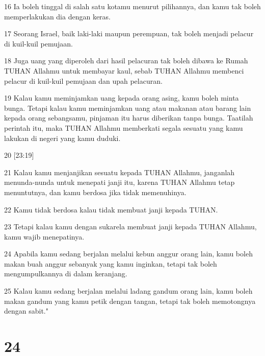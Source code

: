 \par 16 Ia boleh tinggal di salah satu kotamu menurut pilihannya, dan kamu tak boleh memperlakukan dia dengan keras.
\par 17 Seorang Israel, baik laki-laki maupun perempuan, tak boleh menjadi pelacur di kuil-kuil pemujaan.
\par 18 Juga uang yang diperoleh dari hasil pelacuran tak boleh dibawa ke Rumah TUHAN Allahmu untuk membayar kaul, sebab TUHAN Allahmu membenci pelacur di kuil-kuil pemujaan dan upah pelacuran.
\par 19 Kalau kamu meminjamkan uang kepada orang asing, kamu boleh minta bunga. Tetapi kalau kamu meminjamkan uang atau makanan atau barang lain kepada orang sebangsamu, pinjaman itu harus diberikan tanpa bunga. Taatilah perintah itu, maka TUHAN Allahmu memberkati segala sesuatu yang kamu lakukan di negeri yang kamu duduki.
\par 20 [23:19]
\par 21 Kalau kamu menjanjikan sesuatu kepada TUHAN Allahmu, janganlah menunda-nunda untuk menepati janji itu, karena TUHAN Allahmu tetap menuntutnya, dan kamu berdosa jika tidak memenuhinya.
\par 22 Kamu tidak berdosa kalau tidak membuat janji kepada TUHAN.
\par 23 Tetapi kalau kamu dengan sukarela membuat janji kepada TUHAN Allahmu, kamu wajib menepatinya.
\par 24 Apabila kamu sedang berjalan melalui kebun anggur orang lain, kamu boleh makan buah anggur sebanyak yang kamu inginkan, tetapi tak boleh mengumpulkannya di dalam keranjang.
\par 25 Kalau kamu sedang berjalan melalui ladang gandum orang lain, kamu boleh makan gandum yang kamu petik dengan tangan, tetapi tak boleh memotongnya dengan sabit."

\chapter{24}

